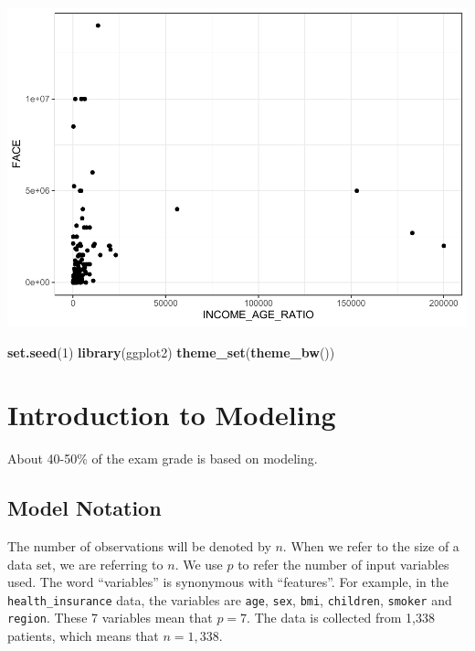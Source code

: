 \documentclass[openany]{book}
\newenvironment{Shaded}{\begin{snugshade}}{\end{snugshade}}
\newcommand{\DecValTok}[1]{\textcolor[rgb]{0.00,0.00,0.81}{#1}}
\newcommand{\KeywordTok}[1]{\textcolor[rgb]{0.13,0.29,0.53}{\textbf{#1}}}
\newcommand{\NormalTok}[1]{#1}
\begin{document}
\includegraphics{04-visualization_files/figure-latex/unnamed-chunk-7-1.pdf}

\begin{Shaded}
\begin{Highlighting}[]
\KeywordTok{set.seed}\NormalTok{(}\DecValTok{1}\NormalTok{)}
\KeywordTok{library}\NormalTok{(ggplot2)}
\KeywordTok{theme_set}\NormalTok{(}\KeywordTok{theme_bw}\NormalTok{())}
\end{Highlighting}
\end{Shaded}

\hypertarget{introduction-to-modeling}{%
\chapter{Introduction to Modeling}\label{introduction-to-modeling}}

About 40-50\% of the exam grade is based on modeling.

\hypertarget{model-notation}{%
\section{Model Notation}\label{model-notation}}

The number of observations will be denoted by \(n\). When we refer to the size of a data set, we are referring to \(n\). We use \(p\) to refer the number of input variables used. The word ``variables'' is synonymous with ``features''. For example, in the \texttt{health\_insurance} data, the variables are \texttt{age}, \texttt{sex}, \texttt{bmi}, \texttt{children}, \texttt{smoker} and \texttt{region}. These 7 variables mean that \(p = 7\). The data is collected from 1,338 patients, which means that \(n = 1,338\).
\end{document}
